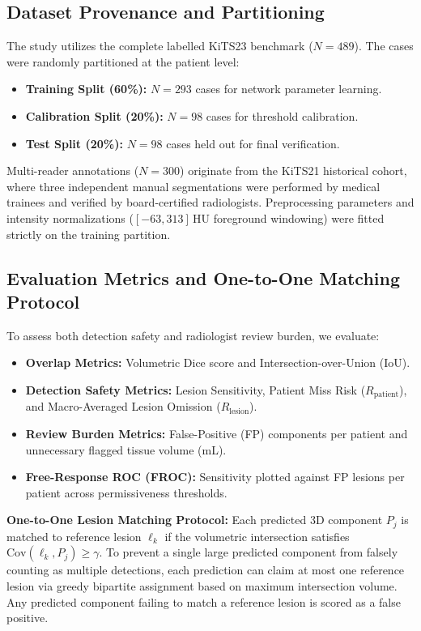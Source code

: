 \documentclass[journal,10pt,twocolumn]{IEEEtran}
\begin{document}
\subsection{Dataset Provenance and Partitioning}
The study utilizes the complete labelled KiTS23 benchmark ($N=489$). The cases were randomly partitioned at the patient level:
\begin{itemize}
    \item \textbf{Training Split (60\%):} $N=293$ cases for network parameter learning.
    \item \textbf{Calibration Split (20\%):} $N=98$ cases for threshold calibration.
    \item \textbf{Test Split (20\%):} $N=98$ cases held out for final verification.
\end{itemize}
Multi-reader annotations ($N=300$) originate from the KiTS21 historical cohort, where three independent manual segmentations were performed by medical trainees and verified by board-certified radiologists. Preprocessing parameters and intensity normalizations ($[-63, 313]$\,HU foreground windowing) were fitted strictly on the training partition.

\subsection{Evaluation Metrics and One-to-One Matching Protocol}
To assess both detection safety and radiologist review burden, we evaluate:
\begin{itemize}
    \item \textbf{Overlap Metrics:} Volumetric Dice score and Intersection-over-Union (IoU).
    \item \textbf{Detection Safety Metrics:} Lesion Sensitivity, Patient Miss Risk ($R_{\mathrm{patient}}$), and Macro-Averaged Lesion Omission ($R_{\mathrm{lesion}}$).
    \item \textbf{Review Burden Metrics:} False-Positive (FP) components per patient and unnecessary flagged tissue volume (mL).
    \item \textbf{Free-Response ROC (FROC):} Sensitivity plotted against FP lesions per patient across permissiveness thresholds.
\end{itemize}

\textbf{One-to-One Lesion Matching Protocol:}
Each predicted 3D component $P_j$ is matched to reference lesion $\ell_k$ if the volumetric intersection satisfies $\mathrm{Cov}(\ell_k, P_j) \ge \gamma$. To prevent a single large predicted component from falsely counting as multiple detections, each prediction can claim at most one reference lesion via greedy bipartite assignment based on maximum intersection volume. Any predicted component failing to match a reference lesion is scored as a false positive.
\end{document}
